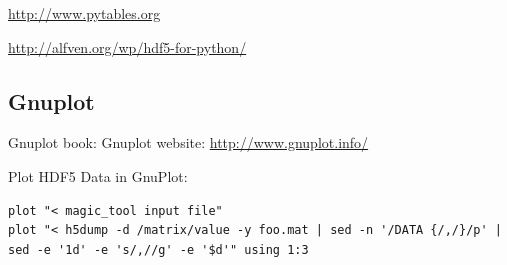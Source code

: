 \url{http://www.pytables.org}

\url{http://alfven.org/wp/hdf5-for-python/}

\subsection{Gnuplot}


Gnuplot book: \cite{Janert2009} 
Gnuplot website: \url{http://www.gnuplot.info/}

Plot HDF5 Data in GnuPlot:

\begin{verbatim}
plot "< magic_tool input file"
plot "< h5dump -d /matrix/value -y foo.mat | sed -n '/DATA {/,/}/p' | sed -e '1d' -e 's/,//g' -e '$d'" using 1:3
\end{verbatim}



